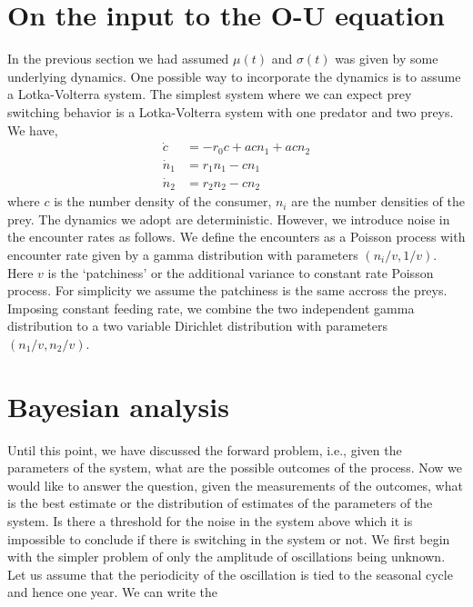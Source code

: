 \documentclass[12pt]{iopart}
\begin{document}
\section{On the input to the O-U equation}
In the previous section we had assumed $\mu(t)$ and $\sigma(t)$ was given by some underlying dynamics. One possible way to incorporate the dynamics is to assume a Lotka-Volterra system. The simplest system where we can expect prey switching behavior is a Lotka-Volterra system with one predator and two preys. We have,
\begin{align}
\label{Lotka-Volterra-system}
\dot{c} &= -r_0 c + a c n_1 + a c n_2 \nonumber \\
\dot{n}_1 &= r_1 n_1 - c n_1 \nonumber \\
\dot{n}_2 &= r_2 n_2 - c n_2
\end{align}
where $c$ is the number density of the consumer, $n_i$ are the number densities of the prey. The dynamics we adopt are deterministic. However, we introduce noise in the encounter rates as follows. We define the encounters as a Poisson process with encounter rate given by a gamma distribution with parameters $(n_i/v, 1/v)$. Here $v$ is the `patchiness' or the additional variance to constant rate Poisson process. For simplicity we assume the patchiness is the same accross the preys. Imposing constant feeding rate, we combine the two independent gamma distribution to a two variable Dirichlet distribution with parameters $(n_1/v, n_2/v)$.


\section{Bayesian analysis}
Until this point, we have discussed the forward problem, i.e., given the parameters of the system, what are the possible outcomes of the process. Now we would like to answer the question, given the measurements of the outcomes, what is the best estimate or the distribution of estimates of the parameters of the system. Is there a threshold for the noise in the system above which it is impossible to conclude if there is switching in the system or not. We first begin with the simpler problem of only the amplitude of oscillations being unknown. Let us assume that the periodicity of the oscillation is tied to the seasonal cycle and hence one year.
We can write the
\end{document}
